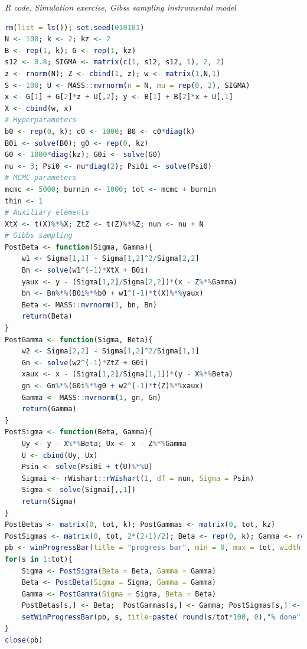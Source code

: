 \begin{enumerate}[leftmargin=*]
\begin{tcolorbox}[enhanced,width=4.67in,center upper,
	fontupper=\large\bfseries,drop shadow southwest,sharp corners]
	\textit{R code. Simulation exercise, Gibss sampling instrumental model}
	\begin{VF}
		\begin{lstlisting}[language=R]
rm(list = ls()); set.seed(010101)
N <- 100; k <- 2; kz <- 2
B <- rep(1, k); G <- rep(1, kz)
s12 <- 0.8; SIGMA <- matrix(c(1, s12, s12, 1), 2, 2)
z <- rnorm(N); Z <- cbind(1, z); w <- matrix(1,N,1)
S <- 100; U <- MASS::mvrnorm(n = N, mu = rep(0, 2), SIGMA)
x <- G[1] + G[2]*z + U[,2]; y <- B[1] + B[2]*x + U[,1]
X <- cbind(w, x)
# Hyperparameters
b0 <- rep(0, k); c0 <- 1000; B0 <- c0*diag(k)
B0i <- solve(B0); g0 <- rep(0, kz)
G0 <- 1000*diag(kz); G0i <- solve(G0)
nu <- 3; Psi0 <- nu*diag(2); Psi0i <- solve(Psi0)
# MCMC parameters
mcmc <- 5000; burnin <- 1000; tot <- mcmc + burnin
thin <- 1
# Auxiliary elements
XtX <- t(X)%*%X; ZtZ <- t(Z)%*%Z; nun <- nu + N
# Gibbs sampling
PostBeta <- function(Sigma, Gamma){
	w1 <- Sigma[1,1] - Sigma[1,2]^2/Sigma[2,2]
	Bn <- solve(w1^(-1)*XtX + B0i)
	yaux <- y - (Sigma[1,2]/Sigma[2,2])*(x - Z%*%Gamma)
	bn <- Bn%*%(B0i%*%b0 + w1^(-1)*t(X)%*%yaux)
	Beta <- MASS::mvrnorm(1, bn, Bn)
	return(Beta)
}
PostGamma <- function(Sigma, Beta){
	w2 <- Sigma[2,2] - Sigma[1,2]^2/Sigma[1,1]
	Gn <- solve(w2^(-1)*ZtZ + G0i)
	xaux <- x - (Sigma[1,2]/Sigma[1,1])*(y - X%*%Beta)
	gn <- Gn%*%(G0i%*%g0 + w2^(-1)*t(Z)%*%xaux)
	Gamma <- MASS::mvrnorm(1, gn, Gn)
	return(Gamma)
}
PostSigma <- function(Beta, Gamma){
	Uy <- y - X%*%Beta; Ux <- x - Z%*%Gamma
	U <- cbind(Uy, Ux)
	Psin <- solve(Psi0i + t(U)%*%U)
	Sigmai <- rWishart::rWishart(1, df = nun, Sigma = Psin)
	Sigma <- solve(Sigmai[,,1]) 
	return(Sigma)
}
PostBetas <- matrix(0, tot, k); PostGammas <- matrix(0, tot, kz)
PostSigmas <- matrix(0, tot, 2*(2+1)/2); Beta <- rep(0, k); Gamma <- rep(0, kz)
pb <- winProgressBar(title = "progress bar", min = 0, max = tot, width = 300)
for(s in 1:tot){
	Sigma <- PostSigma(Beta = Beta, Gamma = Gamma)
	Beta <- PostBeta(Sigma = Sigma, Gamma = Gamma)
	Gamma <- PostGamma(Sigma = Sigma, Beta = Beta)
	PostBetas[s,] <- Beta; 	PostGammas[s,] <- Gamma; PostSigmas[s,] <- matrixcalc::vech(Sigma)
	setWinProgressBar(pb, s, title=paste( round(s/tot*100, 0),"% done"))
}
close(pb)
\end{lstlisting}
	\end{VF}
\end{tcolorbox}


\end{enumerate}
